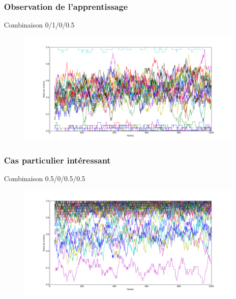\documentclass{beamer}
\begin{document}
\begin{frame}
  \frametitle{Observation de l'apprentissage}

  \center Combinaison 0/1/0/0.5

  \begin{figure}
    \includegraphics[scale=0.265, trim=0 2cm 0 0]{plot/eleve2}
  \end{figure}
\end{frame}

\begin{frame}
  \frametitle{Cas particulier intéressant}

  \center Combinaison 0.5/0/0.5/0.5

  \begin{figure}
    \includegraphics[scale=0.265, trim=0 2cm 0 0]{plot/fake}
  \end{figure}
\end{frame}
\end{document}
